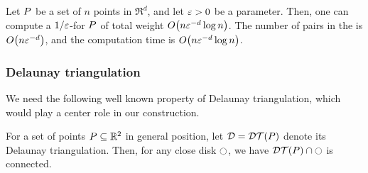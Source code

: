 \documentclass[12pt]{article}%
\begin{document}
\begin{theorem}
    Let $P$ be a set of $n$ points in $\Re^d$, and let $\varepsilon > 0$ be
    a parameter. Then, one can compute a $1/\varepsilon$-\SSPD for $P$ of
    total weight $O\pth{n \eps^{-d} \log n}$. The number of pairs in
    the \SSPD is $O\pth{n \eps^{-d}}$, and the computation time is
    $O\pth{ n \eps^{-d} \log n }$.
\end{theorem}



\subsubsection{Delaunay triangulation}

We need the following well known property of Delaunay triangulation,
which would play a center role in our construction.

\begin{claim}
    For a set of points $P \subseteq \mathbb{R}^2$ in general position, let
    $\DT = \DTX{\PS}$ denote its Delaunay triangulation.  Then, for
    any close disk $\ocircle$, we have $\restrictY{\DTX{\PS}}{\disk}$ is
    connected.
\end{claim}
\end{document}
